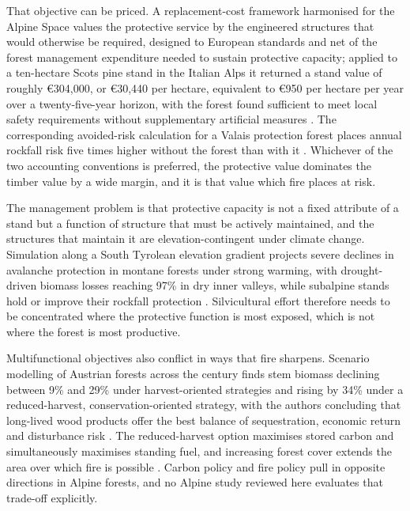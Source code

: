 \documentclass[11pt,a4paper]{article}
\begin{document}
That objective can be priced. A replacement-cost framework harmonised for the Alpine Space values the protective service by the engineered structures that would otherwise be required, designed to European standards and net of the forest management expenditure needed to sustain protective capacity; applied to a ten-hectare Scots pine stand in the Italian Alps it returned a stand value of roughly €304{,}000, or €30{,}440 per hectare, equivalent to €950 per hectare per year over a twenty-five-year horizon, with the forest found sufficient to meet local safety requirements without supplementary artificial measures \citep{accastello_asforesee_2019}. The corresponding avoided-risk calculation for a Valais protection forest places annual rockfall risk five times higher without the forest than with it \citep{moos_climate_2021}. Whichever of the two accounting conventions is preferred, the protective value dominates the timber value by a wide margin, and it is that value which fire places at risk.

The management problem is that protective capacity is not a fixed attribute of a stand but a function of structure that must be actively maintained, and the structures that maintain it are elevation-contingent under climate change. Simulation along a South Tyrolean elevation gradient projects severe declines in avalanche protection in montane forests under strong warming, with drought-driven biomass losses reaching 97\% in dry inner valleys, while subalpine stands hold or improve their rockfall protection \citep{hillebrand_contrasting_2023}. Silvicultural effort therefore needs to be concentrated where the protective function is most exposed, which is not where the forest is most productive.

Multifunctional objectives also conflict in ways that fire sharpens. Scenario modelling of Austrian forests across the century finds stem biomass declining between 9\% and 29\% under harvest-oriented strategies and rising by 34\% under a reduced-harvest, conservation-oriented strategy, with the authors concluding that long-lived wood products offer the best balance of sequestration, economic return and disturbance risk \citep{jandl_strategies_2018}. The reduced-harvest option maximises stored carbon and simultaneously maximises standing fuel, and increasing forest cover extends the area over which fire is possible \citep{gerberding_mapping_2025}. Carbon policy and fire policy pull in opposite directions in Alpine forests, and no Alpine study reviewed here evaluates that trade-off explicitly.
\end{document}
